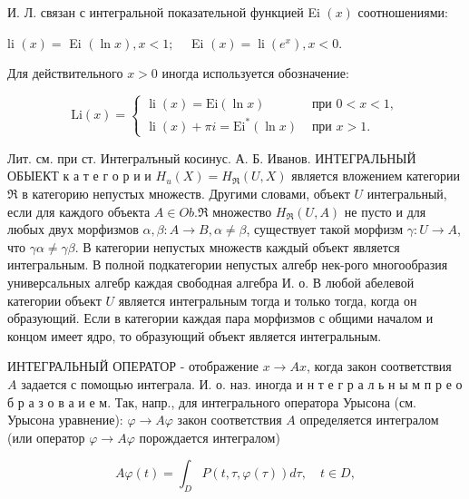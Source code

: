 \documentclass[10pt]{article}
\begin{document}
И. Л. связан с интегральной показательной функцией Ei $(x)$ соотношениями:



li $(x)=$ Ei $(\ln x), x<1 ; \quad$ Ei $(x)=\operatorname{li}\left(e^{x}\right), x<0$.



Для действительного $x>0$ иногда используется обозначение:



\[

\mathrm{Li}(x)= \begin{cases}\operatorname{li}(x)=\mathrm{Ei}(\ln x) & \text { при } 0<x<1, \\ \operatorname{li}(x)+\pi i=\mathrm{Ei}^{*}(\ln x) & \text { при } x>1 .\end{cases}

\]



Лит. см. при ст. Интегралъный косинус. А. Б. Иванов. ИНТЕГРАЛЬНЫЙ ОБЫЕКТ к а т е г о р и и $H_{u}(X)=H_{\Re}(U, X)$ является вложением категории $\Re$ в категорию непустых множеств. Другими словами, объект $U$ интегральный, если для каждого объекта $A \in O b . \Re$ множество $H_{\Re}(U, A)$ не пусто и для любых двух морфизмов $\alpha, \beta: A \rightarrow B, \alpha \neq \beta$, существует такой морфизм $\gamma: U \rightarrow A$, что $\gamma \alpha \neq \gamma \beta$. В категории непустых множеств каждый объект является интегральным. В полной подкатегории непустых алгебр нек-рого многообразия универсальных алгебр каждая свободная алгебра И. о. В любой абелевой категории объект $U$ является интегральным тогда и только тогда, когда он образующий. Если в категории каждая пара морфизмов с общими началом и концом имеет ядро, то образующий объект является интегральным.



ИНТЕГРАЛЬНЫЙ ОПЕРАТОР - отображение $x \rightarrow A x$, когда закон соответствия $A$ задается с помощью интеграла. И. о. наз. иногда и н т е г р а л ь н ы м п р е о б р а з о в а и е м. Так, напр., для интегрального оператора Урысона (см. Урысона уравнение): $\varphi \rightarrow A \varphi$ закон соответствия $A$ определяется интегралом (или оператор $\varphi \rightarrow A \varphi$ порождается интегралом)



\[

A \varphi(t)=\int_{D} P(t, \tau, \varphi(\tau)) d \tau, \quad t \in D,

\]
\end{document}
